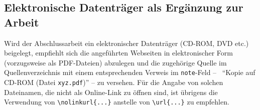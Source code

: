 \subsection{Elektronische Datenträger als Ergänzung zur Arbeit}

Wird der Abschlussarbeit ein elektronischer Datenträger (CD-ROM, DVD
etc.) beigelegt, empfiehlt sich die angeführten Webseiten in
elektronischer Form (vorzugsweise als PDF-Da\-tei\-en) abzulegen
und die zugehörige Quelle im Quellenverzeichnis mit einem 
entsprechenden Verweis im \texttt{note}-Feld -- \zB\
"`Kopie auf CD-ROM (Datei \nolinkurl{xyz.pdf})"' --
zu versehen.
Für die Angabe von solchen Dateinamen, die nicht als Online-Link
zu öffnen sind, ist übrigens die Verwendung von 
\verb!\nolinkurl{...}! anstelle von \verb!\url{...}! zu empfehlen.


